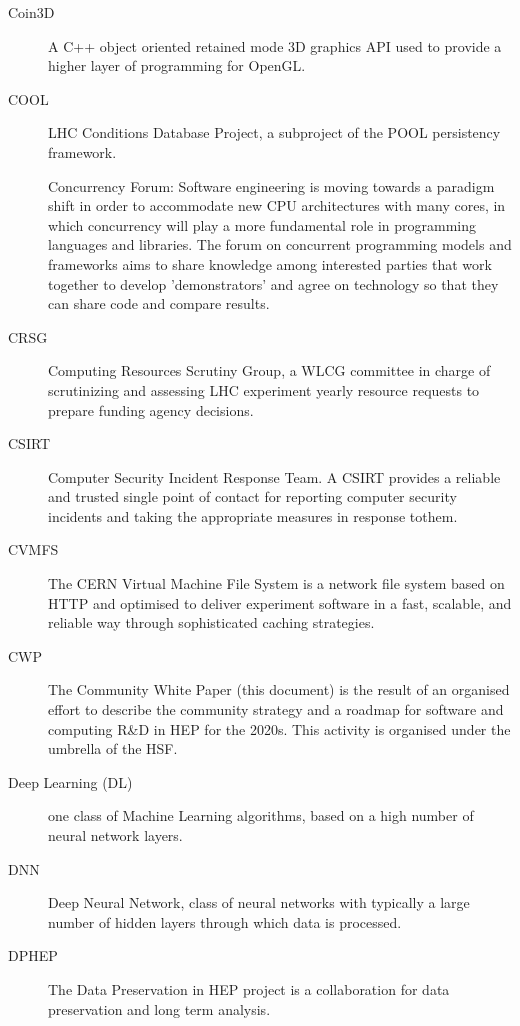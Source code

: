 \documentclass[twocolumn]{svjour3}          %
\begin{document}
\begin{appendices}
\begin{description}
\item[Coin3D] A C++ object oriented retained mode 3D graphics API
used to provide a higher layer of programming for OpenGL.

\item[COOL] LHC Conditions Database Project, a subproject of the POOL persistency framework.

Concurrency Forum: Software engineering is moving towards a paradigm shift in order to accommodate new CPU architectures with many cores, in which concurrency will play a more fundamental role in programming languages and libraries. The forum on concurrent programming models and frameworks aims to share knowledge among interested parties that work together to develop 'demonstrators' and agree on technology so that they can share code and compare results.

\item[CRSG] Computing Resources Scrutiny Group, a WLCG committee in charge of scrutinizing and assessing LHC experiment yearly resource requests to prepare funding agency decisions.

\item[CSIRT] Computer Security Incident Response Team. A CSIRT provides a reliable and trusted single point of contact for reporting computer security incidents and taking the appropriate measures in response tothem.

\item[CVMFS] The CERN Virtual Machine File System is a network file system
based on HTTP and optimised to deliver experiment software in a fast,
scalable, and reliable way through sophisticated caching strategies.

\item[CWP] The Community White Paper (this document) is the result of an
organised effort to describe the community strategy and a roadmap for
software and computing R\&D in HEP for the 2020s. This activity is
organised under the umbrella of the HSF.

\item[Deep Learning (DL)] one class of Machine Learning algorithms, based on a
high number of neural network layers.

\item[DNN] Deep Neural Network, class of neural networks with typically a
large number of hidden layers through which data is processed.

\item[DPHEP] The Data Preservation in HEP project is a collaboration for data
preservation and long term analysis.


\end{description}
\end{appendices}
\end{document}
